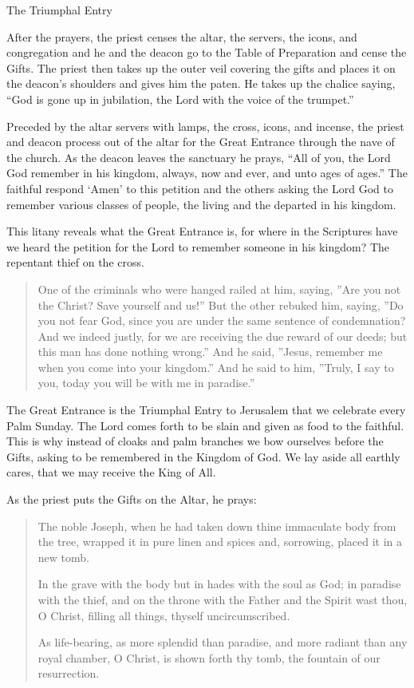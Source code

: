 \documentclass[
]{article}
\newcommand{\RL}[1]{\beginR #1\endR}
\begin{document}
The Triumphal Entry

After the prayers, the priest censes the altar, the servers, the icons,
and congregation and he and the deacon go to the Table of Preparation
and cense the Gifts. The priest then takes up the outer veil covering
the gifts and places it on the deacon's shoulders and gives him the
paten. He takes up the chalice saying, ``God is gone up in jubilation,
the Lord with the voice of the trumpet.''

Preceded by the altar servers with lamps, the cross, icons, and incense,
the priest and deacon process out of the altar for the Great Entrance
through the nave of the church. As the deacon leaves the sanctuary he
prays, ``All of you, the Lord God remember in his kingdom, always, now
and ever, and unto ages of ages.'' The faithful respond `Amen' to this
petition and the others asking the Lord God to remember various classes
of people, the living and the departed in his kingdom.

This litany reveals what the Great Entrance is, for where in the
Scriptures have we heard the petition for the Lord to remember someone
in his kingdom? The repentant thief on the cross.

\begin{quote}
One of the criminals who were hanged railed at him, saying, \RL{''}Are
you not the Christ? Save yourself and us!'' But the other rebuked him,
saying, \RL{''}Do you not fear God, since you are under the same
sentence of condemnation? And we indeed justly, for we are receiving the
due reward of our deeds; but this man has done nothing wrong.'' And he
said, \RL{''}Jesus, remember me when you come into your kingdom.'' And
he said to him, \RL{''}Truly, I say to you, today you will be with me in
paradise.''
\end{quote}

The Great Entrance is the Triumphal Entry to Jerusalem that we celebrate
every Palm Sunday. The Lord comes forth to be slain and given as food to
the faithful. This is why instead of cloaks and palm branches we bow
ourselves before the Gifts, asking to be remembered in the Kingdom of
God. We lay aside all earthly cares, that we may receive the King of
All.

As the priest puts the Gifts on the Altar, he prays:

\begin{quote}
The noble Joseph, when he had taken down thine immaculate body from the
tree, wrapped it in pure linen and spices and, sorrowing, placed it in a
new tomb.

In the grave with the body but in hades with the soul as God; in
paradise with the thief, and on the throne with the Father and the
Spirit wast thou, O Christ, filling all things, thyself uncircumscribed.

As life-bearing, as more splendid than paradise, and more radiant than
any royal chamber, O Christ, is shown forth thy tomb, the fountain of
our resurrection.
\end{quote}
\end{document}
